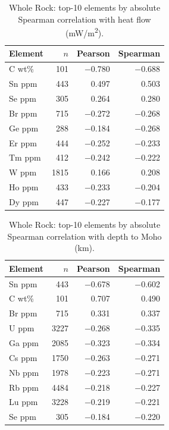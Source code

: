 \begin{table}[H]
  \centering
  \caption{Whole Rock: top-10 elements by absolute Spearman correlation with heat flow (mW/m\textsuperscript{2}).}
  \label{tab:wr-heatflow}
  \begin{tabular}{lrrr}
    \toprule
    Element & $n$ & Pearson & Spearman \\
    \midrule
    C wt\%  & 101  & $-$0.780 & $-$0.688 \\
    Sn ppm  & 443  & 0.497    & 0.503 \\
    Se ppm  & 305  & 0.264    & 0.280 \\
    Br ppm  & 715  & $-$0.272 & $-$0.268 \\
    Ge ppm  & 288  & $-$0.184 & $-$0.268 \\
    Er ppm  & 444  & $-$0.252 & $-$0.233 \\
    Tm ppm  & 412  & $-$0.242 & $-$0.222 \\
    W ppm   & 1815 & 0.166    & 0.208 \\
    Ho ppm  & 433  & $-$0.233 & $-$0.204 \\
    Dy ppm  & 447  & $-$0.227 & $-$0.177 \\
    \bottomrule
  \end{tabular}
\end{table}

\begin{table}[H]
  \centering
  \caption{Whole Rock: top-10 elements by absolute Spearman correlation with depth to Moho (km).}
  \label{tab:wr-moho}
  \begin{tabular}{lrrr}
    \toprule
    Element & $n$ & Pearson & Spearman \\
    \midrule
    Sn ppm & 443  & $-$0.678 & $-$0.602 \\
    C wt\% & 101  & 0.707    & 0.490 \\
    Br ppm & 715  & 0.331    & 0.337 \\
    U ppm  & 3227 & $-$0.268 & $-$0.335 \\
    Ga ppm & 2085 & $-$0.323 & $-$0.334 \\
    Cs ppm & 1750 & $-$0.263 & $-$0.271 \\
    Nb ppm & 1978 & $-$0.223 & $-$0.271 \\
    Rb ppm & 4484 & $-$0.218 & $-$0.227 \\
    Lu ppm & 3228 & $-$0.219 & $-$0.221 \\
    Se ppm & 305  & $-$0.184 & $-$0.220 \\
    \bottomrule
  \end{tabular}
\end{table}

